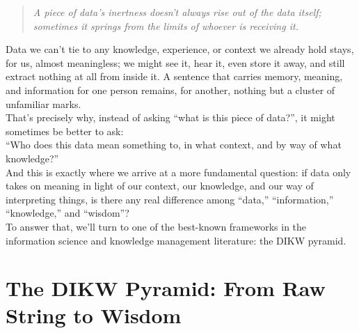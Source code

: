 \begin{quote}
\itshape
A piece of data's inertness doesn't always rise out of the data itself; sometimes it springs from the limits of whoever is receiving it.
\end{quote}
Data we can't tie to any knowledge, experience, or context we already hold stays, for us, almost meaningless; we might see it, hear it, even store it away, and still extract nothing at all from inside it. A sentence that carries memory, meaning, and information for one person remains, for another, nothing but a cluster of unfamiliar marks.\\
That's precisely why, instead of asking ``what is this piece of data?'', it might sometimes be better to ask:\\
``Who does this data mean something to, in what context, and by way of what knowledge?''\\
And this is exactly where we arrive at a more fundamental question: if data only takes on meaning in light of our context, our knowledge, and our way of interpreting things, is there any real difference among ``data,'' ``information,'' ``knowledge,'' and ``wisdom''?\\
To answer that, we'll turn to one of the best-known frameworks in the information science and knowledge management literature: the DIKW pyramid.
\newpage
\section{The DIKW Pyramid: From Raw String to Wisdom}
\label{sec:levels-of-data}

